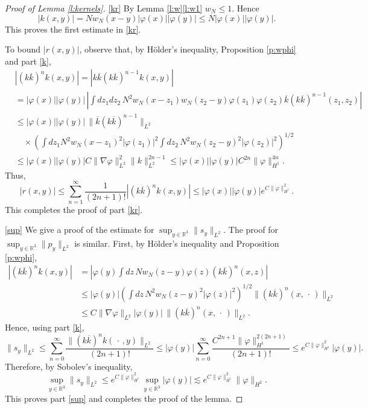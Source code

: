 \documentclass[11pt,a4paper,draft,DIV11]{scrartcl}	%
\newcommand{\R}{\mathds{R}}
\begin{document}
\begin{proof}[Proof of Lemma \ref{l:kernels}]
  \ref{kr} By Lemma \ref{l:w}\ref{l:w1} $w_N \leq 1$. Hence
  \[
    |k(x,y)| = N w_N(x-y) |\varphi(x)| |\varphi(y)| \leq N |\varphi(x)|
    |\varphi(y)|.
  \]
  This proves the first estimate in \ref{kr}.
   
  To bound $\lvert r(x,y)\rvert$, observe that, by H\"older's inequality, Proposition
  \ref{p:wphi} and part \ref{k},
  \begin{align*}
    & |( k \overline{k})^n k(x,y)| = | k \overline{k} ( k \overline{k})^{n-1}
    k(x,y)| \\
    & = |\varphi(x)| |\varphi(y)| \, \left| \int dz_1 dz_2 \, N^2 w_N(x-z_1)
    w_N(z_2-y) \varphi(z_1) \varphi(z_2) \overline{k}(k
    \overline{k})^{n-1}(z_1,z_2) \right| \\
    & \le |\varphi(x)| |\varphi(y)| \, \| \overline{k} (k \overline{k})^{n-1}
    \|_{L^2} \\
    & \quad \times \left( \int dz_1 N^2 w_N(x-z_1)^2 |\varphi(z_1)|^2 \int
    dz_2 \, N^2 w_N(z_2-y)^2 |\varphi(z_2)|^2 \right)^{1/2} \\
    & \le |\varphi(x)| |\varphi(y)| C \| \nabla \varphi \|_{L^2}^2 \| k
    \|_{L^2}^{2n-1} \le |\varphi(x)| |\varphi(y)| C^{2n} \| \varphi
    \|_{H^1}^{4n}.
  \end{align*}
  Thus,
  \[
    |r(x,y)| \le \sum_{n=1}^\infty \frac{1}{(2n+1)!} |( k \overline{k})^n k
    (x,y)|\le |\varphi(x)| |\varphi(y)| e^{C \| \varphi \|_{H^1}^2}.
  \]
  This completes the proof of part \ref{kr}.


  \ref{sup} We give a proof of the estimate for $\sup_{y \in \R^3} \| s_y
  \|_{L^2}$. The proof for $\sup_{y \in \R^3} \| p_y \|_{L^2}$ is similar.
  First, by H\"older's inequality and Proposition \ref{p:wphi},
  \begin{align*}
    |(k \overline{k})^n k(x,y)| & = \left| \varphi(y) \int dz \, N w_N(z-y)
    \varphi(z) (k \overline{k})^n(x,z) \right| \\
    & \le |\varphi(y)| \left( \int dz \, N^2 w_N(z-y)^2 |\varphi(z)|^2
    \right)^{1/2} \| (k \overline{k})^n(x,\, \cdot\,) \|_{L^2} \\
    & \le C \| \nabla \varphi \|_{L^2} | \varphi(y)| \, \| (k \overline{k}
    )^n(x,\, \cdot\,) \|_{L^2}.
  \end{align*}
  Hence, using part \ref{k},
  \[
    \| s_y \|_{L^2} \le \sum_{n=0}^\infty \frac{\| (k \overline{k})^n k(\,
    \cdot\,,y) \|_{L^2}}{(2n+1)!} \le |\varphi(y)| \sum_{n=0}^\infty
    \frac{C^{2n+1} \| \varphi \|_{H^1}^{2(2n+1)}}{(2n+1)!} \le e^{C \|
    \varphi\|_{H^1}^2} |\varphi(y)|.
  \]
  Therefore, by Sobolev's inequality,
  \[
    \sup_{y \in \R^3} \| s_y \|_{L^2} \le e^{C \| \varphi \|_{H^1}^2} \sup_{y
    \in \R^3} |\varphi(y)| \apprle e^{C \| \varphi \|_{H^1}^2} \| \varphi
    \|_{H^2}.
  \]
  This proves part \ref{sup} and completes the proof of the lemma.
\end{proof}
\end{document}
